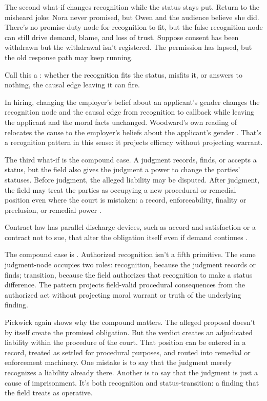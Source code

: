 \documentclass[12pt]{article}
\begin{document}
The second what-if changes recognition while the status stays put. Return to the misheard joke: Nora never promised, but Owen and the audience believe she did. There's no promise-duty node for recognition to fit, but the false recognition node can still drive demand, blame, and loss of trust. Suppose consent has been withdrawn but the withdrawal isn't registered. The permission has lapsed, but the old response path may keep running.

Call this a : whether the recognition fits the status, misfits it, or answers to nothing, the causal edge leaving it can fire.

In hiring, changing the employer's belief about an applicant's gender changes the recognition node and the causal edge from recognition to callback while leaving the applicant and the moral facts unchanged. Woodward's own reading of  relocates the cause to the employer's beliefs about the applicant's gender \citep{woodward2014MethodologyOntology}. That's a recognition pattern in this sense: it projects efficacy without projecting warrant.

The third what-if is the compound case. A judgment records, finds, or accepts a status, but the field also gives the judgment a power to change the parties' statuses. Before judgment, the alleged liability may be disputed. After judgment, the field may treat the parties as occupying a new procedural or remedial position even where the court is mistaken: a record, enforceability, finality or preclusion, or remedial power \citep[\S\S~17--19, 24, 27]{americanLawInstitute1982RestatementJudgments}.

Contract law has parallel discharge devices, such as accord and satisfaction or a contract not to sue, that alter the obligation itself even if demand continues \citep[\S\S~281, 285]{americanLawInstitute1981RestatementContracts}.

The compound case is . Authorized recognition isn't a fifth primitive. The same judgment-node occupies two roles: recognition, because the judgment records or finds; transition, because the field authorizes that recognition to make a status difference. The pattern projects field-valid procedural consequences from the authorized act without projecting moral warrant or truth of the underlying finding.

Pickwick again shows why the compound matters. The alleged proposal doesn't by itself create the promised obligation. But the verdict creates an adjudicated liability within the procedure of the court. That position can be entered in a record, treated as settled for procedural purposes, and routed into remedial or enforcement machinery. One mistake is to say that the judgment merely recognizes a liability already there. Another is to say that the judgment is just a cause of imprisonment. It's both recognition and status-transition: a finding that the field treats as operative.
\end{document}
